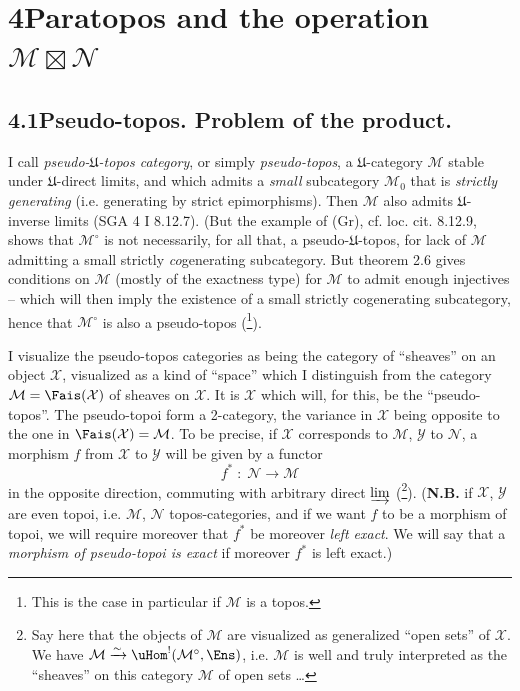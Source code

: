 

\section*{4\quad Paratopos and the operation $\mathcal{M}\boxtimes\mathcal{N}$}

\subsection*{4.1\quad Pseudo-topos. Problem of the product.}

I call \textit{pseudo-$\mathfrak{U}$-topos category}, or simply \textit{pseudo-topos}, a $\mathfrak{U}$-category $\mathcal{M}$ stable under $\mathfrak{U}$-direct limits, and which admits a \textit{small} subcategory $\mathcal{M}_0$ that is \textit{strictly generating} (i.e. generating by strict epimorphisms). Then $\mathcal{M}$ also admits $\mathfrak{U}$-inverse limits (SGA 4 I 8.12.7). (But the example of (Gr), cf. loc. cit. 8.12.9, shows that $\mathcal{M}^\circ$ is not necessarily, for all that, a pseudo-$\mathfrak{U}$-topos, for lack of $\mathcal{M}$ admitting a small strictly \textit{co}generating subcategory. But theorem 2.6 gives conditions on $\mathcal{M}$ (mostly of the exactness type) %
for $\mathcal{M}$ to admit enough injectives -- which will then imply the existence of a small strictly cogenerating subcategory, hence that $\mathcal{M}^\circ$ is also a pseudo-topos (\footnote{This is the case in particular if $\mathcal{M}$ is a topos.}).

I visualize the pseudo-topos categories as being the category of ``sheaves'' on an object $\mathcal{X}$, visualized as a kind of ``space'' which I distinguish from the category $\mathcal{M}=\Fais(\mathcal{X})$ of sheaves on $\mathcal{X}$. It is $\mathcal{X}$ which will, for this, be the ``pseudo-topos''. The pseudo-topoi form a 2-category, the variance in $\mathcal{X}$ being opposite to the one in $\Fais(\mathcal{X})=\mathcal{M}$. To be precise, if $\mathcal{X}$ corresponds to $\mathcal{M}$, $\mathcal{Y}$ to $\mathcal{N}$, a morphism $f$ from $\mathcal{X}$ to $\mathcal{Y}$ will be given by a functor
\[
f^* \;:\; \mathcal{N} \longrightarrow \mathcal{M}
\tag*{(4.1.1)}
\]
in the opposite direction, commuting with arbitrary direct $\varinjlim$ (\footnote{Say here that the objects of $\mathcal{M}$ are visualized as generalized ``open sets'' of $\mathcal{X}$. We have $\mathcal{M}\xrightarrow{\sim}\uHom^!(\mathcal{M}^\circ,\Ens)$, i.e. $\mathcal{M}$ is well and truly interpreted as the ``sheaves'' on this category $\mathcal{M}$ of open sets \ldots}). (\textbf{N.B.} if $\mathcal{X}$, $\mathcal{Y}$ are even topoi, i.e. $\mathcal{M}$, $\mathcal{N}$ topos-categories, and if we want $f$ to be a morphism of topoi, we will require moreover that $f^*$ be moreover \textit{left exact}. We will say that a \textit{morphism of pseudo-topoi is exact} if moreover $f^*$ is left exact.)

